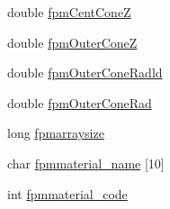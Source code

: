 \begin{DoxyCompactItemize}
double \hyperlink{structOPTPIAACMCDESIGN_afc48f92c305dcd5b0ed1b3571eae68c8}{fpm\+Cent\+Cone\+Z}
\item 
double \hyperlink{structOPTPIAACMCDESIGN_a4951d69d7b5188a02510b3815812906e}{fpm\+Outer\+Cone\+Z}
\item 
double \hyperlink{structOPTPIAACMCDESIGN_a0feae8a5f179899a7cbd57e49e1c52df}{fpm\+Outer\+Cone\+Radld}
\item 
double \hyperlink{structOPTPIAACMCDESIGN_a640ea4b5690796066d3fc69aae0b157b}{fpm\+Outer\+Cone\+Rad}
\item 
long \hyperlink{structOPTPIAACMCDESIGN_a02a2edaa7c78edec5ec36133783318a9}{fpmarraysize}
\item 
char \hyperlink{structOPTPIAACMCDESIGN_a229a4f5b2b0f11256ad6447aa7240c4a}{fpmmaterial\+\_\+name} \mbox{[}10\mbox{]}
\item 
int \hyperlink{structOPTPIAACMCDESIGN_a109986baab6ae4c894500a5f2e350677}{fpmmaterial\+\_\+code}
\end{DoxyCompactItemize}


